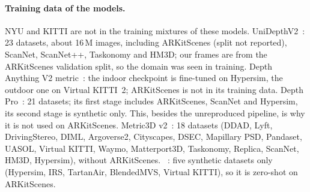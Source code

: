 \documentclass[10pt,twocolumn,letterpaper]{article}
\begin{document}
\paragraph{Training data of the models.}
NYU and KITTI are not in the training mixtures of these models.
UniDepthV2~\cite{piccinelli2025unidepthv2}: 23 datasets, about 16\,M images, including ARKitScenes (split not reported), ScanNet, ScanNet++, Taskonomy and HM3D; our frames are from the ARKitScenes validation split, so the domain was seen in training.
Depth Anything V2 metric~\cite{yang2024dav2}: the indoor checkpoint is fine-tuned on Hypersim, the outdoor one on Virtual KITTI~2; ARKitScenes is not in its training data.
Depth Pro~\cite{bochkovskii2025depthpro}: 21 datasets; its first stage includes ARKitScenes, ScanNet and Hypersim, its second stage is synthetic only. This, besides the unreproduced pipeline, is why it is not used on ARKitScenes.
Metric3D v2~\cite{hu2024metric3dv2}: 18 datasets (DDAD, Lyft, DrivingStereo, DIML, Argoverse2, Cityscapes, DSEC, Mapillary PSD, Pandaset, UASOL, Virtual KITTI, Waymo, Matterport3D, Taskonomy, Replica, ScanNet, HM3D, Hypersim), without ARKitScenes.
\omnidc~\cite{zuo2025omnidc}: five synthetic datasets only (Hypersim, IRS, TartanAir, BlendedMVS, Virtual KITTI), so it is zero-shot on ARKitScenes.
\end{document}
